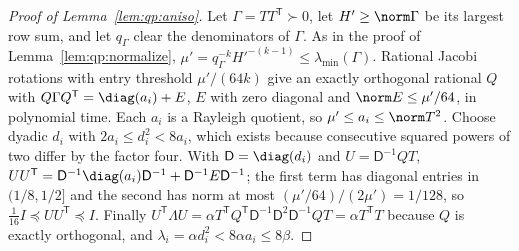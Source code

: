 \begin{proof}[Proof of Lemma~\ref{lem:qp:aniso}]
Let $\Gamma=TT^{\mathsf T}\succ0$, let $H'\ge\norm\Gamma$ be its largest row sum, and
let $q_\Gamma$ clear the denominators of $\Gamma$. As in the proof of
Lemma~\ref{lem:qp:normalize}, $\mu'=q_\Gamma^{-k}H'^{-(k-1)}\le\lambda_{\min}(\Gamma)$.
Rational Jacobi rotations with entry threshold $\mu'/(64k)$ give an exactly
orthogonal rational $Q$ with $Q\Gamma Q^{\mathsf T}=\diag(a_i)+E$, $E$ with zero
diagonal and $\norm E\le\mu'/64$, in polynomial time. Each $a_i$ is a Rayleigh
quotient, so $\mu'\le a_i\le\norm T^2$. Choose dyadic $d_i$ with
$2a_i\le d_i^2<8a_i$, which exists because consecutive squared powers of two
differ by the factor four. With $\mathsf D=\diag(d_i)$ and
$U=\mathsf D^{-1}QT$, $UU^{\mathsf T}=\mathsf D^{-1}\diag(a_i)\mathsf D^{-1}+\mathsf D^{-1}E\mathsf D^{-1}$;
the first term has diagonal entries in $(1/8,1/2]$ and the second has norm at
most $(\mu'/64)/(2\mu')=1/128$, so $\frac1{16}I\preceq UU^{\mathsf T}\preceq I$. Finally
$U^{\mathsf T}\Lambda U=\alpha T^{\mathsf T} Q^{\mathsf T}\mathsf D^{-1}\mathsf D^2\mathsf D^{-1}QT=\alpha T^{\mathsf T} T$
because $Q$ is exactly orthogonal, and
$\lambda_i=\alpha d_i^2<8\alpha a_i\le8\beta$.
\end{proof}

